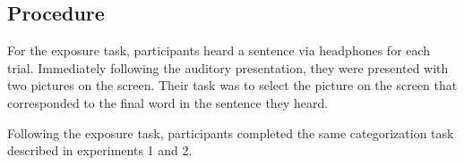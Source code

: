 \subsection{Procedure}

For the exposure task, participants heard a sentence via headphones for each trial.  Immediately following the auditory presentation, they were presented with two pictures on the screen.  Their task was to select the picture on the screen that corresponded to the final word in the sentence they heard.

Following the exposure task, participants completed the same categorization task described in experiments 1 and 2.

